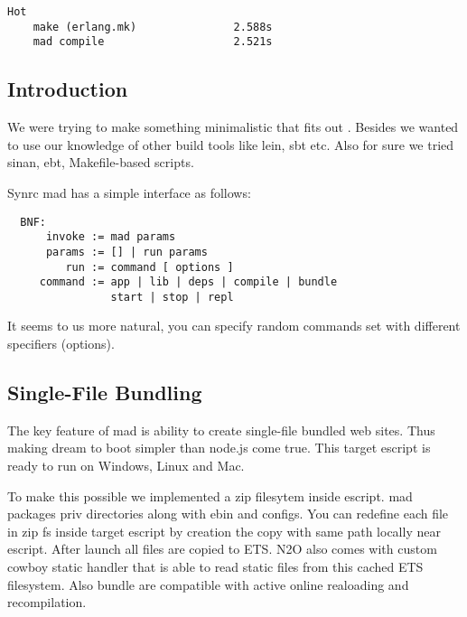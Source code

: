 \vspace{1\baselineskip}
\begin{lstlisting}[caption=Example of building Cowboy]
                                   Hot
    make (erlang.mk)               2.588s
    mad compile                    2.521s
\end{lstlisting}
\vspace{1\baselineskip}

\subsection{Introduction}

We were trying to make something minimalistic that fits out .
Besides we wanted to use our knowledge of other build tools like lein, sbt etc.
Also for sure we tried sinan, ebt, Makefile-based scripts.

Synrc mad has a simple interface as follows:

\vspace{1\baselineskip}
\begin{lstlisting}
  BNF:
      invoke := mad params
      params := [] | run params
         run := command [ options ]
     command := app | lib | deps | compile | bundle
                start | stop | repl
\end{lstlisting}
\vspace{1\baselineskip}

It seems to us more natural, you can specify random
commands set with different specifiers (options).

\subsection{Single-File Bundling}

The key feature of mad is ability to create single-file bundled web sites.
Thus making dream to boot simpler than node.js come true.
This target escript is ready to run on Windows, Linux and Mac.

To make this possible we implemented a zip filesytem inside escript.
mad packages priv directories along with ebin and configs.
You can redefine each file in zip fs inside target
escript by creation the copy with same path locally near escript.
After launch all files are copied to ETS.
N2O also comes with custom cowboy static handler that is able to
read static files from this cached ETS filesystem.
Also bundle are compatible with active online realoading and recompilation.

